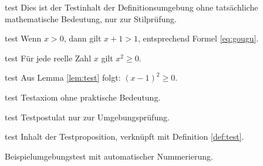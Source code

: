 \documentclass[de]{../../elegantbook}
\begin{document}
\ifdefined\simpleTest
\begin{definition}[Testdefinition]\label{def:test}
\else
\begin{definition}[Testdefinition]{test}
\fi
Dies ist der Testinhalt der Definitionsumgebung ohne tatsächliche mathematische Bedeutung, nur zur Stilprüfung.
\end{definition}

\ifdefined\simpleTest
\begin{theorem}[Testsatz]\label{thm:test}
\else
\begin{theorem}[Testsatz]{test}
\fi
Wenn $x>0$, dann gilt $x+1>1$, entsprechend Formel \eqref{eq:gougu}.
\end{theorem}

\ifdefined\simpleTest
\begin{lemma}[Testlemma]\label{lem:test}
\else
\begin{lemma}[Testlemma]{test}
\fi
Für jede reelle Zahl $x$ gilt $x^2\geq0$.
\end{lemma}

\ifdefined\simpleTest
\begin{corollary}[Testkorollar]\label{cor:test}
\else
\begin{corollary}[Testkorollar]{test}
\fi
Aus Lemma \ref{lem:test} folgt: $(x-1)^2\geq0$.
\end{corollary}

\ifdefined\simpleTest
\begin{axiom}[Testaxiom]\label{axi:test}
\else
\begin{axiom}[Testaxiom]{test}
\fi
Testaxiom ohne praktische Bedeutung.
\end{axiom}

\ifdefined\simpleTest
\begin{postulate}[Testpostulat]\label{pos:test}
\else
\begin{postulate}[Testpostulat]{test}
\fi
Testpostulat nur zur Umgebungsprüfung.
\end{postulate}

\ifdefined\simpleTest
\begin{proposition}[Testproposition]\label{pro:test}
\else
\begin{proposition}[Testproposition]{test}
\fi
Inhalt der Testproposition, verknüpft mit Definition \ref{def:test}.
\end{proposition}

\begin{example}\label{exa:test}
Beispielumgebungstest mit automatischer Nummerierung.
\end{example}


\end{proposition}
\end{postulate}
\end{axiom}
\end{corollary}
\end{lemma}
\end{theorem}
\end{definition}
\end{document}
